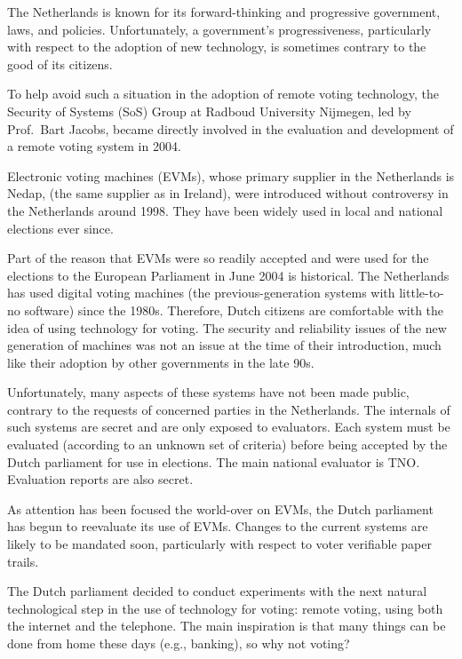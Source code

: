 \documentclass[times, 10pt, twocolumn]{article}
\newcommand{\NL}{the Netherlands\xspace}
\begin{document}

The Netherlands is known for its forward-thinking and progressive government, 
laws, and policies. Unfortunately, a government's progressiveness, particularly 
with respect to the adoption of new technology, is sometimes contrary to the 
good of its citizens.

To help avoid such a situation in the adoption of remote voting technology, the 
Security of Systems (SoS) Group at Radboud University Nijmegen, led by 
Prof.~Bart Jacobs, became directly involved in the evaluation and development 
of a remote voting system in 2004.


Electronic voting machines (EVMs), whose primary supplier in \NL is Nedap, (the 
same supplier as in Ireland), were introduced without controversy in \NL 
around 1998. They have been widely used in local and national elections ever 
since.

Part of the reason that EVMs were so readily accepted and were used for the 
elections to the European Parliament in June 2004 is historical.  The 
Netherlands has used digital voting machines (the previous-generation systems 
with little-to-no software) since the 1980s.  Therefore, Dutch citizens are 
comfortable with the idea of using technology for voting. The security and 
reliability issues of the new generation of machines was not an issue at the 
time of their introduction, much like their adoption by other governments in 
the late 90s.

Unfortunately, many aspects of these systems have not been made public, 
contrary to the requests of concerned parties in \NL.  The internals of such 
systems are secret and are only exposed to evaluators.  Each system must be 
evaluated (according to an unknown set of criteria) before being accepted by 
the Dutch parliament for use in elections.  The main national evaluator is TNO. 
Evaluation reports are also secret.

As attention has been focused the world-over on EVMs, the Dutch parliament has 
begun to reevaluate its use of EVMs.  Changes to the current systems are likely 
to be mandated soon, particularly with respect to voter verifiable paper trails.

The Dutch parliament decided to conduct experiments with the next natural
technological 
step in the use of technology for voting: remote voting, using both the 
internet and the telephone.  The main inspiration is that many things can be 
done from home these days (e.g., banking), so why not voting?
\end{document}
